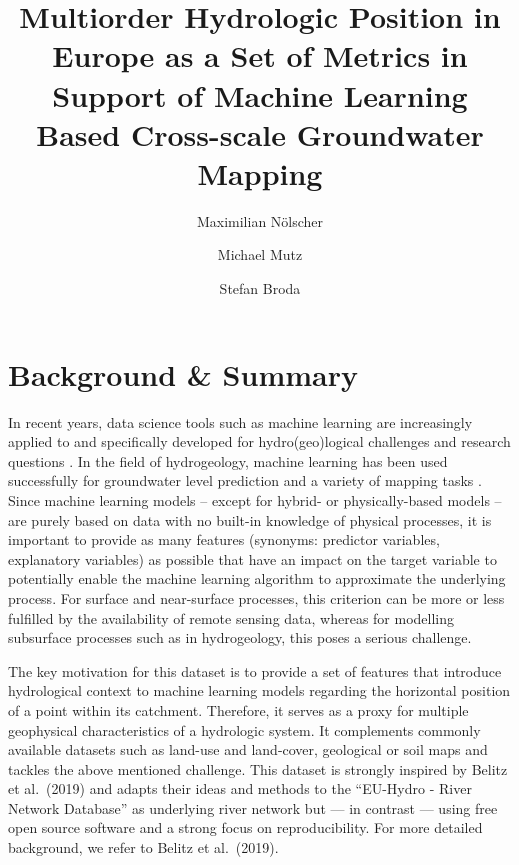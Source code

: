 \documentclass[fleqn,10pt]{wlscirep}
\title{Multiorder Hydrologic Position in Europe as a Set of Metrics in Support of Machine Learning Based Cross-scale Groundwater Mapping}
\author[*, 1]{Maximilian Nölscher}
\author[2]{Michael Mutz}
\author[1]{Stefan Broda}
\affil[1]{Federal Institute for Geosciences and Natural Resources (BGR), Berlin, 13593, Germany}
\affil[2]{independent researcher}
\affil[*]{corresponding author: Maximilian Nölscher (maximilian.noelscher@bgr.de, max-n@posteo.de)}
\begin{document}
\flushbottom
\maketitle

\thispagestyle{empty}

\hypertarget{background-summary}{%
\section{Background \& Summary}\label{background-summary}}

In recent years, data science tools such as machine learning are increasingly applied to and specifically developed for hydro(geo)logical challenges and research questions \cite{zounemat-kermani_neurocomputing_2020}. In the field of hydrogeology, machine learning has been used successfully for groundwater level prediction and a variety of mapping tasks \cite{desimone_machine-learning_2020, knoll_large_2019, knoll_nation-wide_2020, mueller_surrogate_2019, stackelberg_machine_2021, wang_comparison_2016, wunsch_forecasting_2018, wunsch_groundwater_2020}. Since machine learning models -- except for hybrid- or physically-based models -- are purely based on data with no built-in knowledge of physical processes, it is important to provide as many features (synonyms: predictor variables, explanatory variables) as possible that have an impact on the target variable to potentially enable the machine learning algorithm to approximate the underlying process. For surface and near-surface processes, this criterion can be more or less fulfilled by the availability of remote sensing data, whereas for modelling subsurface processes such as in hydrogeology, this poses a serious challenge.

The key motivation for this dataset is to provide a set of features that introduce hydrological context to machine learning models regarding the horizontal position of a point within its catchment. Therefore, it serves as a proxy for multiple geophysical characteristics of a hydrologic system. It complements commonly available datasets such as land-use and land-cover, geological or soil maps and tackles the above mentioned challenge.
This dataset is strongly inspired by Belitz et al.~(2019)\cite{belitz_multiorder_2019} and adapts their ideas and methods to the ``EU-Hydro - River Network Database'' as underlying river network but --- in contrast --- using free open source software and a strong focus on reproducibility. For more detailed background, we refer to Belitz et al.~(2019)\cite{belitz_multiorder_2019}.
\end{document}
